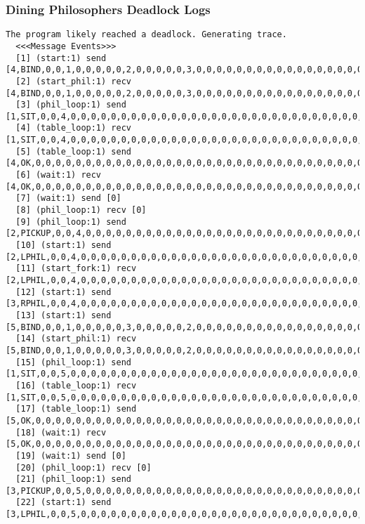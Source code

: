 \subsubsection{Dining Philosophers Deadlock Logs}
\begin{lstlisting}[xleftmargin=.01\linewidth, xrightmargin=0.01\linewidth, caption={Dining Philosophers Verlixir Report.}, label={lst:dp_bug}]
  The program likely reached a deadlock. Generating trace.
  <<<Message Events>>>
  [1] (start:1) send [4,BIND,0,0,1,0,0,0,0,0,2,0,0,0,0,0,3,0,0,0,0,0,0,0,0,0,0,0,0,0,0,0,0,0,0,0,0,0,0,0,0,0,0,0]
  [2] (start_phil:1) recv [4,BIND,0,0,1,0,0,0,0,0,2,0,0,0,0,0,3,0,0,0,0,0,0,0,0,0,0,0,0,0,0,0,0,0,0,0,0,0,0,0,0,0,0,0]
  [3] (phil_loop:1) send [1,SIT,0,0,4,0,0,0,0,0,0,0,0,0,0,0,0,0,0,0,0,0,0,0,0,0,0,0,0,0,0,0,0,0,0,0,0,0,0,0,0,0,0,0]
  [4] (table_loop:1) recv [1,SIT,0,0,4,0,0,0,0,0,0,0,0,0,0,0,0,0,0,0,0,0,0,0,0,0,0,0,0,0,0,0,0,0,0,0,0,0,0,0,0,0,0,0]
  [5] (table_loop:1) send [4,OK,0,0,0,0,0,0,0,0,0,0,0,0,0,0,0,0,0,0,0,0,0,0,0,0,0,0,0,0,0,0,0,0,0,0,0,0,0,0,0,0,0,0]
  [6] (wait:1) recv [4,OK,0,0,0,0,0,0,0,0,0,0,0,0,0,0,0,0,0,0,0,0,0,0,0,0,0,0,0,0,0,0,0,0,0,0,0,0,0,0,0,0,0,0]
  [7] (wait:1) send [0]
  [8] (phil_loop:1) recv [0]
  [9] (phil_loop:1) send [2,PICKUP,0,0,4,0,0,0,0,0,0,0,0,0,0,0,0,0,0,0,0,0,0,0,0,0,0,0,0,0,0,0,0,0,0,0,0,0,0,0,0,0,0,0]
  [10] (start:1) send [2,LPHIL,0,0,4,0,0,0,0,0,0,0,0,0,0,0,0,0,0,0,0,0,0,0,0,0,0,0,0,0,0,0,0,0,0,0,0,0,0,0,0,0,0,0]
  [11] (start_fork:1) recv [2,LPHIL,0,0,4,0,0,0,0,0,0,0,0,0,0,0,0,0,0,0,0,0,0,0,0,0,0,0,0,0,0,0,0,0,0,0,0,0,0,0,0,0,0,0]
  [12] (start:1) send [3,RPHIL,0,0,4,0,0,0,0,0,0,0,0,0,0,0,0,0,0,0,0,0,0,0,0,0,0,0,0,0,0,0,0,0,0,0,0,0,0,0,0,0,0,0]
  [13] (start:1) send [5,BIND,0,0,1,0,0,0,0,0,3,0,0,0,0,0,2,0,0,0,0,0,0,0,0,0,0,0,0,0,0,0,0,0,0,0,0,0,0,0,0,0,0,0]
  [14] (start_phil:1) recv [5,BIND,0,0,1,0,0,0,0,0,3,0,0,0,0,0,2,0,0,0,0,0,0,0,0,0,0,0,0,0,0,0,0,0,0,0,0,0,0,0,0,0,0,0]
  [15] (phil_loop:1) send [1,SIT,0,0,5,0,0,0,0,0,0,0,0,0,0,0,0,0,0,0,0,0,0,0,0,0,0,0,0,0,0,0,0,0,0,0,0,0,0,0,0,0,0,0]
  [16] (table_loop:1) recv [1,SIT,0,0,5,0,0,0,0,0,0,0,0,0,0,0,0,0,0,0,0,0,0,0,0,0,0,0,0,0,0,0,0,0,0,0,0,0,0,0,0,0,0,0]
  [17] (table_loop:1) send [5,OK,0,0,0,0,0,0,0,0,0,0,0,0,0,0,0,0,0,0,0,0,0,0,0,0,0,0,0,0,0,0,0,0,0,0,0,0,0,0,0,0,0,0]
  [18] (wait:1) recv [5,OK,0,0,0,0,0,0,0,0,0,0,0,0,0,0,0,0,0,0,0,0,0,0,0,0,0,0,0,0,0,0,0,0,0,0,0,0,0,0,0,0,0,0]
  [19] (wait:1) send [0]
  [20] (phil_loop:1) recv [0]
  [21] (phil_loop:1) send [3,PICKUP,0,0,5,0,0,0,0,0,0,0,0,0,0,0,0,0,0,0,0,0,0,0,0,0,0,0,0,0,0,0,0,0,0,0,0,0,0,0,0,0,0,0]
  [22] (start:1) send [3,LPHIL,0,0,5,0,0,0,0,0,0,0,0,0,0,0,0,0,0,0,0,0,0,0,0,0,0,0,0,0,0,0,0,0,0,0,0,0,0,0,0,0,0,0]

\end{lstlisting}
